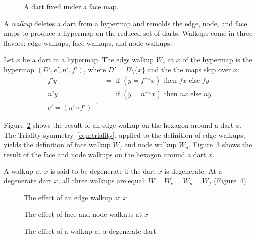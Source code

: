 \begin{figure}[htb]
  \centering
  \caption{A dart fixed under a face map.}
  \label{fig:dart-fix}
\end{figure}


A {\it walkup} deletes
a dart from a hypermap and remolds the edge, node, and face
maps to produce a hypermap on the reduced set of darts.  Walkups
come in three flavors: edge walkups, face walkups,
and node walkups.

\begin{definition}
Let $x$ be a dart in a hypermap.  The edge walkup 
$W_e$ at $x$ of the hypermap is the hypermap
$(D',e',n',f')$, where $D' = D\setminus\{x\}$ and the
the maps skip over $x$:
    $$
    \begin{array}{lll}
    f' y &= \text{ if } (y = f^{-1} x) \text{ then } f x \text{ else
    } f y\\
    n' y &= \text{ if } (y = n^{-1} x) \text{ then } n x \text{ else
    } n y\\
    e' = (n'\circ f')^{-1}
    \end{array}
    $$
\end{definition}

Figure~\ref{fig:walk} shows
the result of an edge walkup on the hexagon around a dart $x$.
The Triality symmetry~\ref{eqn:triality}, applied to the definition
of edge walkups, yields the definition of
face walkup $W_f$ and node walkup $W_n$.  
Figure~\ref{fig:walkfn} shows the result of the face and node
walkups on the hexagon around a dart $x$.

A walkup at $x$ is said to be degenerate 
if the dart $x$ is degenerate.   
At a degenerate dart $x$, all three walkups
are equal: $W=W_e=W_n=W_f$ (Figure~\ref{fig:walkdeg}).

\begin{figure}[htb]
  \centering
  \caption{The effect of an edge walkup at $x$}
  \label{fig:walk}
\end{figure}

\begin{figure}[htb]
  \centering
  \caption{The effect of face and node walkups at $x$}
  \label{fig:walkfn}
\end{figure}

\begin{figure}[htb]
  \centering
  \caption{The effect of a walkup at a degenerate dart}
  \label{fig:walkdeg}
\end{figure}


